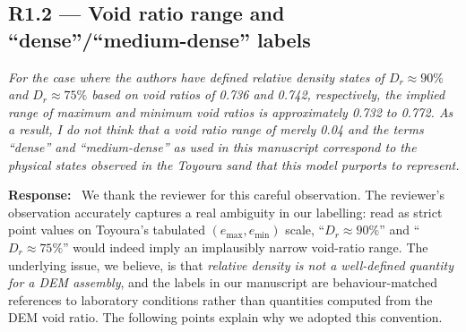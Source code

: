\documentclass[11pt,a4paper]{article}
\newenvironment{rcomment}
  {\begin{leftbar}\color{black!75}\itshape}
  {\end{leftbar}\vspace{0.3em}}
\newcommand{\response}{\par\noindent\textbf{Response:}\ \ignorespaces}
\begin{document}
\FloatBarrier

\subsection*{R1.2 --- Void ratio range and ``dense''/``medium-dense'' labels}

\begin{rcomment}
For the case where the authors have defined relative density states of
$D_r \approx 90\%$ and $D_r \approx 75\%$ based on void ratios of 0.736 and
0.742, respectively, the implied range of maximum and minimum void ratios is
approximately 0.732 to 0.772. As a result, I do not think that a void ratio
range of merely 0.04 and the terms ``dense'' and ``medium-dense'' as used in
this manuscript correspond to the physical states observed in the Toyoura
sand that this model purports to represent.
\end{rcomment}

\response
We thank the reviewer for this careful observation. The reviewer's
observation accurately captures a real ambiguity in our labelling:
read as strict point values on Toyoura's tabulated $(e_{\max},
e_{\min})$ scale, ``$D_r \approx 90\%$'' and ``$D_r \approx 75\%$''
would indeed imply an implausibly narrow void-ratio range. The
underlying issue, we believe, is that \emph{relative density is not
a well-defined quantity for a DEM assembly}, and the labels in our
manuscript are behaviour-matched references to laboratory
conditions rather than quantities computed from the DEM void ratio.
The following points explain why we adopted this convention.
\end{document}
